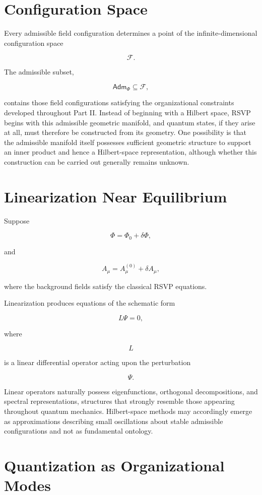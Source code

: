 \documentclass[11pt,oneside]{book}
\numberwithin{equation}{chapter}
\theoremstyle{definition}
\theoremstyle{plain}
\newcommand{\Adm}{\mathsf{Adm}}
\begin{document}
\section{Configuration Space}

Every admissible field configuration determines a point of the
infinite-dimensional configuration space

\[
\mathcal F.
\]

The admissible subset,

\[
\Adm_\Phi
\subseteq
\mathcal F,
\]

contains those field configurations satisfying the organizational constraints developed throughout Part II. Instead of beginning with a Hilbert space, RSVP begins with this admissible geometric manifold, and quantum states, if they arise at all, must therefore be constructed from its geometry. One possibility is that the admissible manifold itself possesses sufficient geometric structure to support an inner product and hence a Hilbert-space representation, although whether this construction can be carried out generally remains unknown.

\section{Linearization Near Equilibrium}

Suppose

\[
\Phi
=
\Phi_0
+
\delta\Phi,
\]

and

\[
A_\mu
=
A_\mu^{(0)}
+
\delta A_\mu,
\]

where the background fields satisfy the classical RSVP equations.

Linearization produces equations of the schematic form

\[
L
\Psi
=
0,
\]

where

\[
L
\]

is a linear differential operator acting upon the perturbation

\[
\Psi.
\]

Linear operators naturally possess eigenfunctions, orthogonal decompositions, and spectral representations, structures that strongly resemble those appearing throughout quantum mechanics. Hilbert-space methods may accordingly emerge as approximations describing small oscillations about stable admissible configurations and not as fundamental ontology.

\section{Quantization as Organizational Modes}
\end{document}
